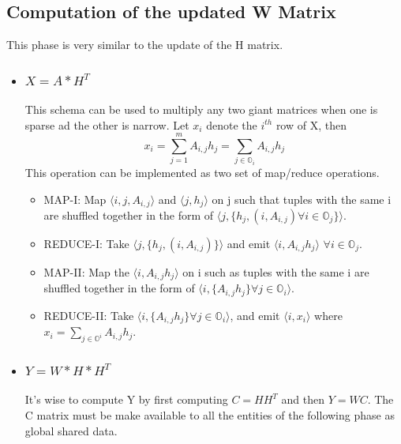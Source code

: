 \documentclass[a4paper,12pt]{article}
\begin{document}
	
	\subsection{Computation of the updated W Matrix}
    This phase is very similar to the update of the H matrix.

    \begin{itemize}
      \item \subsubsection{$ X = A * H^T $}
        This schema can be used to multiply any two giant matrices when one
        is sparse ad the other is narrow. Let $x_i$ denote the $i^{th}$ row of X, then 
        $$ x_i = \sum_{j=1}^{m} A_{i,j} h_{j} = \sum_{j \in \mathbb{O}_i} A_{i,j} h_{j} $$
        This operation can be implemented as two set of map/reduce
        operations.
        \begin{itemize}
          \item MAP-I: Map $ \langle i, j, A_{i,j} \rangle $ and $\langle j, h_j \rangle$ on j
            such that tuples with the same i are shuffled together in
            the form of  $ \langle j, \{h_{j}, (i, A_{i,j}) \forall i \in \mathbb{O}_j \} \rangle$.

         \item REDUCE-I: Take  $ \langle j, \{h_{j}, (i, A_{i,j}) \}
           \rangle$ and emit  $ \langle i, A_{i,j}  h_{j} \rangle$ $\forall i \in \mathbb{O}_j $.

          \item MAP-II: Map the $ \langle i, A_{i,j}  h_{j} \rangle$ on i such as tuples with the 
            same i are shuffled together in the form of $ \langle i, \{A_{i,j}  h_{j} \}
           \forall j \in \mathbb{O}_i \rangle$.

          \item REDUCE-II: Take $ \langle i, \{A_{i,j}  h_{j} \}
           \forall j \in \mathbb{O}_i \rangle$, and emit $\langle i,
           x_i \rangle$ where $ x_i = \sum_{j \in \mathbb{O}^i} A_{i,j}  h_{j} $.

         \end{itemize}

     \item \subsubsection{$ Y = W * H * H^T $}
       It's wise to compute Y by first computing $C= H H^T$ and then
       $Y=WC$. The C matrix must be make available to all the entities
       of the following phase as global
       shared data.


\end{itemize}
\end{document}

